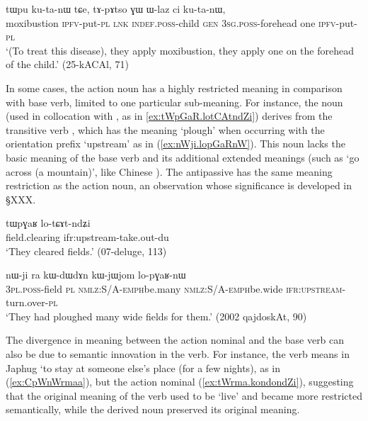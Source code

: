 \begin{exe}
\ex \label{ex:tWpu.kutanW}
\gll tɯpu ku-ta-nɯ tɕe, tɤ-pɤtso ɣɯ ɯ-laz ci ku-ta-nɯ, \\
moxibustion \textsc{ipfv}-put-\textsc{pl} \textsc{lnk} \textsc{indef}.\textsc{poss}-child \textsc{gen} \textsc{3sg}.\textsc{poss}-forehead one \textsc{ipfv}-put-\textsc{pl} \\
\glt `(To treat this disease), they apply moxibustion, they apply one on the forehead of the child.' (25-kACAl, 71)
\end{exe}


In some cases, the action noun has a highly restricted meaning in comparison with base verb, limited to one particular sub-meaning. For instance, the noun  (used in collocation with , as in \ref{ex:tWpGaR.lotCAtndZi}) derives from the transitive verb , which has the meaning `plough' when occurring with the orientation prefix `upstream' as in (\ref{ex:nWji.lopGaRnW}). This noun lacks the basic meaning of the base verb and its additional extended meanings (such as `go across (a mountain)', like Chinese ). The antipassive  has the same meaning restriction as the action noun, an observation whose significance is developed in §XXX.

\begin{exe}
\ex \label{ex:tWpGaR.lotCAtndZi}
\gll tɯpɣaʁ lo-tɕɤt-ndʑi \\
field.clearing ifr:upstream-take.out-du \\
\glt `They cleared fields.' (07-deluge, 113)
\end{exe}

\begin{exe}
\ex \label{ex:nWji.lopGaRnW}
\gll nɯ-ji ra kɯ-dɯ\redp{}dɤn kɯ-jɯ\redp{}jom lo-pɣaʁ-nɯ \\
\textsc{3pl}.\textsc{poss}-field \textsc{pl} \textsc{nmlz}:S/A-\textsc{emph}\redp{}be.many \textsc{nmlz}:S/A-\textsc{emph}\redp{}be.wide \textsc{ifr}:\textsc{upstream}-turn.over-\textsc{pl} \\
\glt `They had ploughed many wide fields for them.' (2002 qajdoskAt, 90)
\end{exe}


 

The divergence in meaning between the action nominal and the base verb can also be due to semantic innovation in the verb. For instance, the verb  means in Japhug `to stay at someone else's place (for a few nights), as in (\ref{ex:CpWnWrmaa}), but the action nominal  (\ref{ex:tWrma.kondondZi}), suggesting that the original meaning of the verb used to be `live' and became more restricted semantically, while the derived noun preserved its original meaning.

